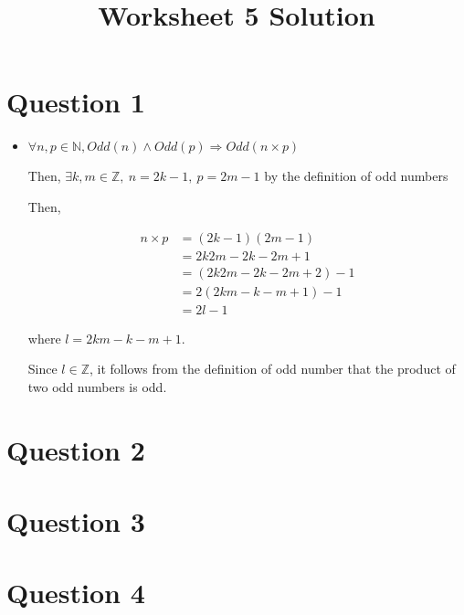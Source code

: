 \documentclass[12pt]{article}
\begin{document}
\title{Worksheet 5 Solution}
\maketitle

\section*{Question 1}
\begin{itemize}
    \item

    $\forall n,p \in \mathbb{N}, Odd(n) \land Odd(p) \Rightarrow Odd(n \times p)$

    Then, $\exists k,m \in \mathbb{Z},\:n = 2k - 1,\: p = 2m -1$ by the definition of
    odd numbers

    Then,

    \begin{align}
        n \times p &= (2k-1)(2m-1)\\
        &= 2k2m - 2k - 2m + 1 \\
        &=(2k2m - 2k - 2m + 2) - 1 \\
        &=2(2km - k - m + 1) - 1\\
        &=2l - 1
    \end{align}

    where $l = 2km - k - m + 1$.

    Since $l \in \mathbb{Z}$, it follows from the definition of odd number that the product
    of two odd numbers is odd.

\end{itemize}

\section*{Question 2}

\section*{Question 3}

\section*{Question 4}
\end{document}
